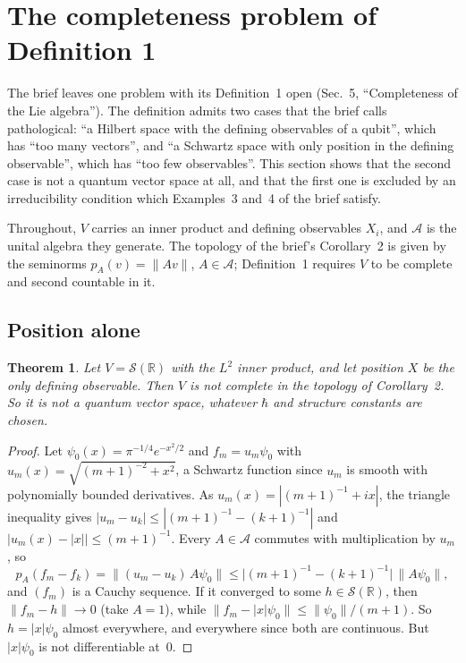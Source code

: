 \documentclass[11pt]{article}
\newtheorem{theorem}{Theorem}[section]
\theoremstyle{definition}
\begin{document}
\section{The completeness problem of Definition 1}
\label{sec:irreducible}

The brief leaves one problem with its Definition~1 open (Sec.~5, ``Completeness of the Lie
algebra''). The definition admits two cases that the brief calls pathological: ``a Hilbert space
with the defining observables of a qubit'', which has ``too many vectors'', and ``a Schwartz space
with only position in the defining observable'', which has ``too few observables''. This section
shows that the second case is not a quantum vector space at all, and that the first one is
excluded by an irreducibility condition which Examples~3 and~4 of the brief satisfy.

Throughout, $V$ carries an inner product and defining observables $X_i$, and $\mathcal A$ is the
unital algebra they generate. The topology of the brief's Corollary~2 is given by the seminorms
$p_A(v) = \|Av\|$, $A \in \mathcal A$; Definition~1 requires $V$ to be complete and second
countable in it.

\subsection{Position alone}

\begin{theorem}\label{thm:posonly}
  Let $V = \mathcal S(\mathbb R)$ with the $L^2$ inner product, and let position $X$ be the only
  defining observable. Then $V$ is not complete in the topology of Corollary~2. So it is not a
  quantum vector space, whatever $\hbar$ and structure constants are chosen.
\end{theorem}

\begin{proof}
  Let $\psi_0(x) = \pi^{-1/4}e^{-x^2/2}$ and $f_m = u_m\psi_0$ with
  $u_m(x) = \sqrt{(m+1)^{-2} + x^2}$, a Schwartz function since $u_m$ is smooth with polynomially
  bounded derivatives. As $u_m(x) = |(m+1)^{-1} + ix|$, the triangle inequality gives
  $|u_m - u_k| \le |(m+1)^{-1} - (k+1)^{-1}|$ and $|u_m(x) - |x|| \le (m+1)^{-1}$. Every
  $A \in \mathcal A$ commutes with multiplication by $u_m$, so
  \[
    p_A(f_m - f_k) = \|(u_m - u_k)\,A\psi_0\| \le \bigl|(m+1)^{-1} - (k+1)^{-1}\bigr|\,\|A\psi_0\|,
  \]
  and $(f_m)$ is a Cauchy sequence. If it converged to some $h \in \mathcal S(\mathbb R)$, then
  $\|f_m - h\| \to 0$ (take $A = 1$), while $\|f_m - |x|\psi_0\| \le \|\psi_0\|/(m+1)$. So
  $h = |x|\psi_0$ almost everywhere, and everywhere since both are continuous. But $|x|\psi_0$ is
  not differentiable at~$0$.
\end{proof}
\end{document}

